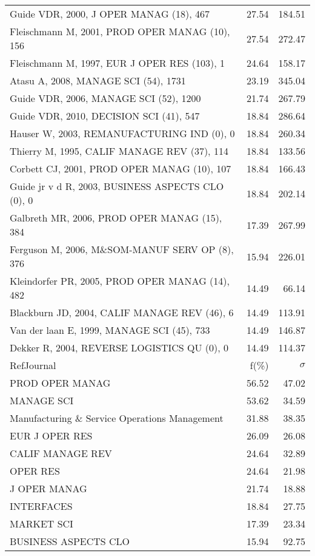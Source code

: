 \documentclass[a4paper,11pt]{report}
\begin{document}
\begin{landscape}
\begin{table}[!ht]
{\begin{tabular}{|l r r|}
Guide VDR, 2000, J OPER MANAG (18), 467 & 27.54 & 184.51\\
Fleischmann M, 2001, PROD OPER MANAG (10), 156 & 27.54 & 272.47\\
Fleischmann M, 1997, EUR J OPER RES (103), 1 & 24.64 & 158.17\\
Atasu A, 2008, MANAGE SCI (54), 1731 & 23.19 & 345.04\\
Guide VDR, 2006, MANAGE SCI (52), 1200 & 21.74 & 267.79\\
Guide VDR, 2010, DECISION SCI (41), 547 & 18.84 & 286.64\\
Hauser W, 2003, REMANUFACTURING IND (0), 0 & 18.84 & 260.34\\
Thierry M, 1995, CALIF MANAGE REV (37), 114 & 18.84 & 133.56\\
Corbett CJ, 2001, PROD OPER MANAG (10), 107 & 18.84 & 166.43\\
Guide jr v d R, 2003, BUSINESS ASPECTS CLO (0), 0 & 18.84 & 202.14\\
Galbreth MR, 2006, PROD OPER MANAG (15), 384 & 17.39 & 267.99\\
Ferguson M, 2006, M\&SOM-MANUF SERV OP (8), 376 & 15.94 & 226.01\\
Kleindorfer PR, 2005, PROD OPER MANAG (14), 482 & 14.49 & 66.14\\
Blackburn JD, 2004, CALIF MANAGE REV (46), 6 & 14.49 & 113.91\\
Van der laan E, 1999, MANAGE SCI (45), 733 & 14.49 & 146.87\\
Dekker R, 2004, REVERSE LOGISTICS QU (0), 0 & 14.49 & 114.37\\
\hline
\hline
RefJournal & f(\%) & $\sigma$\\
\hline
PROD OPER MANAG & 56.52 & 47.02\\
MANAGE SCI & 53.62 & 34.59\\
Manufacturing \& Service Operations Management & 31.88 & 38.35\\
EUR J OPER RES & 26.09 & 26.08\\
CALIF MANAGE REV & 24.64 & 32.89\\
OPER RES & 24.64 & 21.98\\
J OPER MANAG & 21.74 & 18.88\\
INTERFACES & 18.84 & 27.75\\
MARKET SCI & 17.39 & 23.34\\
BUSINESS ASPECTS CLO & 15.94 & 92.75\\
\hline
\end{tabular}
}
\end{table}


\end{landscape}
\end{document}
